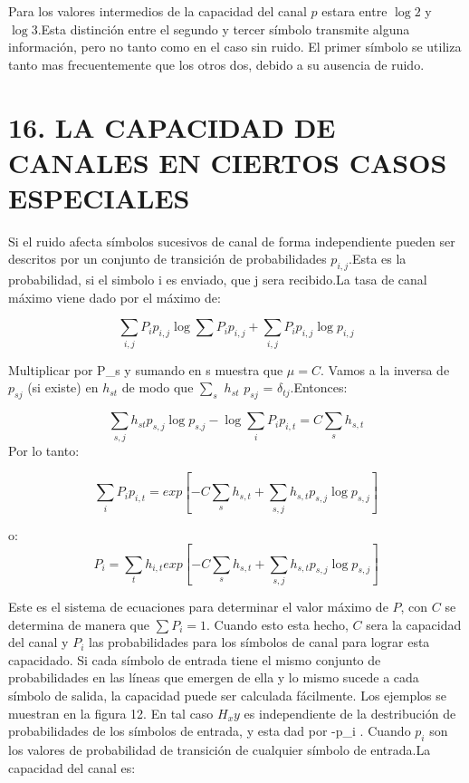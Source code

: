Para los valores intermedios de la capacidad del canal $p$ estara entre $\log{2}$ y $\log{3}$.Esta distinci\'on 
entre el segundo y tercer s\'imbolo transmite alguna informaci\'on, pero no tanto como en el caso sin ruido.
El primer s\'imbolo se utiliza tanto mas frecuentemente que los otros dos, debido a su ausencia de ruido.

\section{16. LA CAPACIDAD DE CANALES EN CIERTOS CASOS ESPECIALES}


Si el ruido afecta s\'imbolos sucesivos de canal de forma independiente pueden ser descritos por un conjunto de transici\'on 
de probabilidades $p_{i,j}$.Esta es la probabilidad, si el simbolo i es enviado, que j sera recibido.La tasa de canal m\'aximo 
viene dado por el m\'aximo de:

\begin{equation}
	\sum_{i,j}P_i p_{i,j} \log{\sum{P_i p_{i,j}}} + \sum_{i,j}P_i p_{i,j}\log{p_{i,j}}
\end{equation}
 
Multiplicar por P_s y sumando en s muestra que $\mu = C$. Vamos a la inversa de $p_{sj}$ (si existe) en $h_{st}$  de modo que 
$\sum_{s}$ $h_{st}$ $p_{sj}$ = $\delta_{tj}$.Entonces: 

\begin{equation}
	\sum_{s,j}h_{st} p_{s,j} \log{p_{s.j}} - \log{\sum_{i}P_i p_{i,t}} = C \sum_{s} h_{s,t}
\end{equation}
Por lo tanto:

\begin{equation}
	\sum_{i} P_i p_{i,t} = exp[- C \sum_{s} h_{s,t}+ \sum_{s,j} h_{s,t} p_{s,j} \log{p_{s,j}}]
\end{equation}

o:  
\begin{equation}
	P_i = \sum_{t} h_{i,t} exp[ - C \sum_{s} h_{s,t}+ \sum_{s,j} h_{s,t} p_{s,j} \log{p_{s,j}} ]
\end{equation}


Este es el sistema de ecuaciones para determinar el valor m\'aximo de $P$, con $C$ se determina 
de manera que $\sum P_i = 1$. Cuando esto esta hecho, $C$ sera la capacidad del canal y $P_i$ las probabilidades 
para los s\'imbolos de canal para lograr esta capacidado.
Si cada s\'imbolo de entrada tiene el mismo conjunto de probabilidades en las l\'ineas que emergen de ella 
y lo mismo sucede a cada s\'imbolo de salida, la capacidad puede ser calculada f\'acilmente. Los ejemplos se muestran en la figura 12. 
En tal caso $H_xy$ es independiente de la destribuci\'on de probabilidades de los s\'imbolos de entrada, y esta dad por -\sum p_i . 
Cuando $p_i$ son los valores de probabilidad de transici\'on de cualquier s\'imbolo de entrada.La capacidad del canal es:

